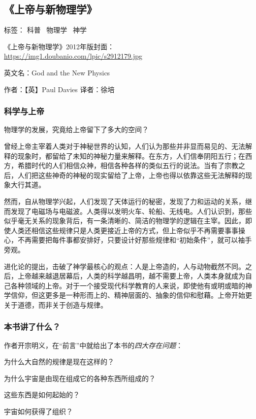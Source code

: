 \subsection{《上帝与新物理学》}

标签： 科普 \  物理学 \  神学

《上帝与新物理学》2012年版封面：\url{https://img1.doubanio.com/lpic/s2912179.jpg}

英文名：God and the New Physics

作者：【英】Paul Davies
译者：徐培

\subsubsection{科学与上帝}
物理学的发展，究竟给上帝留下了多大的空间？

曾经上帝主宰着人类对于神秘世界的认知，人们认为那些并非显而易见的、无法解释的现象时，都留给了未知的神秘力量来解释。在东方，人们信奉阴阳五行；在西方，希腊时代的人们相信众神，相信各种各样的类似五行的说法。当有了宗教之后，人们把这些神奇的神秘的现实留给了上帝，上帝也得以依靠这些无法解释的现象大行其道。

然而，自从物理学兴起，人们发现了天体运行的秘密，发现了力和运动的关系，继而发现了电磁场与电磁波。人类得以发明火车、轮船、无线电。人们认识到，那些似乎毫无关系的现象背后，有一条清晰的、简洁的物理学的逻辑在主宰。因此，即使人类还相信这些规律只是人类更接近上帝的方式，但上帝似乎不再需要事事操心，不再需要把每件事都安排好，只要设计好那些规律和“初始条件”，就可以袖手旁观。

进化论的提出，击破了神学最核心的观点：人是上帝造的，人与动物截然不同。之后，上帝越来越退居幕后，人类的科学越昌明，越不需要上帝，人类本身就成为自己各种领域的上帝。对于一个接受现代科学教育的人来说，即使他有或明或暗的神学信仰，但这更多是一种形而上的、精神层面的、抽象的信仰和慰藉。上帝开始更关于道德，而非关于创造与规律。

\subsubsection{本书讲了什么？}

作者开宗明义，在“前言”中就给出了本书的\emph{四大存在问题}：
\begin{itemize*}
	\item 为什么大自然的规律是现在这样的？
	\item 为什么宇宙是由现在组成它的各种东西所组成的？
	\item 这些东西是如何起始的？
	\item 宇宙如何获得了组织？
\end{itemize*}

